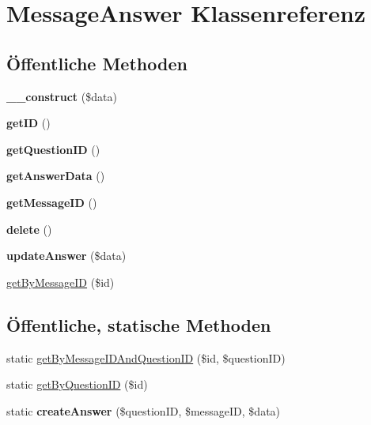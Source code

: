 \hypertarget{class_message_answer}{}\section{Message\+Answer Klassenreferenz}
\label{class_message_answer}
\subsection*{Öffentliche Methoden}
\begin{DoxyCompactItemize}
\item 
\mbox{\label{class_message_answer_a26927f01f5d52a8d1ca4cf89d16434c4}} 
{\bfseries \+\_\+\+\_\+construct} (\$data)
\item 
\mbox{\label{class_message_answer_a81aeb932aeed595027f1b7f72e3842db}} 
{\bfseries get\+ID} ()
\item 
\mbox{\label{class_message_answer_af447c90ff04cd576af1bed601bb21197}} 
{\bfseries get\+Question\+ID} ()
\item 
\mbox{\label{class_message_answer_a13659db6ab4e527da9a5c75c8f4c2973}} 
{\bfseries get\+Answer\+Data} ()
\item 
\mbox{\label{class_message_answer_a2b35e16d5bbb0d98fa1ea870160d78ac}} 
{\bfseries get\+Message\+ID} ()
\item 
\mbox{\label{class_message_answer_a0120968940d6f041fd8ed0c3c05e3465}} 
{\bfseries delete} ()
\item 
\mbox{\label{class_message_answer_a38b77f0020edfc07d0b2f5b25cc91b9b}} 
{\bfseries update\+Answer} (\$data)
\item 
\mbox{\hyperlink{class_message_answer_a880b6000aa29dd9a98eaf66d7d090eba}{get\+By\+Message\+ID}} (\$id)
\end{DoxyCompactItemize}
\subsection*{Öffentliche, statische Methoden}
\begin{DoxyCompactItemize}
\item 
static \mbox{\hyperlink{class_message_answer_a883af5afad6d2399954096c0a5fb25fb}{get\+By\+Message\+I\+D\+And\+Question\+ID}} (\$id, \$question\+ID)
\item 
static \mbox{\hyperlink{class_message_answer_a3268cc849880c5209261359a2976dda8}{get\+By\+Question\+ID}} (\$id)
\item 
\mbox{\label{class_message_answer_a7fdf413007b7770e52add7d5aa3e0d3a}} 
static {\bfseries create\+Answer} (\$question\+ID, \$message\+ID, \$data)
\end{DoxyCompactItemize}


